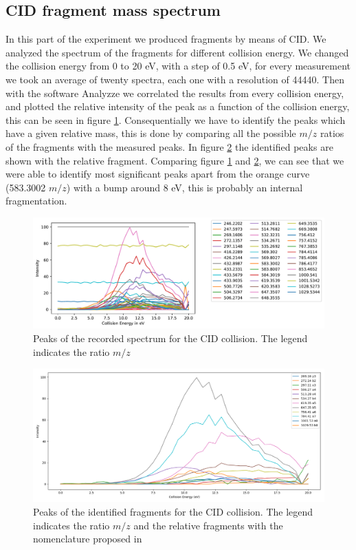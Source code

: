 \documentclass[a4paper,10pt]{article}
\begin{document}
\newpage

\subsection{CID fragment mass spectrum}
In this part of the experiment we produced fragments by means of CID. We analyzed the spectrum of the fragments for  different collision energy. %
We changed the collision energy from 0 to 20 eV, with a step of 0.5 eV, for every measurement we took an average of twenty spectra, each one with a resolution of 44440. Then with the software Analyzze we correlated the results from every collision energy, and plotted the relative intensity of the peak as a function of the collision energy, this can be seen in figure \ref{cidcollision}.
Consequentially we have to identify the peaks which have a given relative mass, this is done by comparing all the possible $m/z$ ratios of the fragments with the measured peaks. In figure \ref{cidcollisionidentified} the identified peaks are shown with the relative fragment. Comparing figure \ref{cidcollision} and \ref{cidcollisionidentified}, we can see that we were able to identify most significant peaks apart from the orange curve (583.3002 $m/z$) with a bump around 8 eV, this is probably an internal fragmentation.
\begin{figure}[H]
	\centering
	\includegraphics[width = \textwidth]{cid_collision}
	\caption{Peaks of the recorded spectrum for the CID collision. The legend indicates the ratio $m/z$}
	\label{cidcollision}
\end{figure}
\begin{figure}[H]
	\centering
	\includegraphics[width = \textwidth]{identifiedcid}
	\caption{Peaks of the identified fragments for the CID collision. The legend indicates the ratio $m/z$ and the relative fragments with the nomenclature proposed in \cite{fragmentsnomenclature}}
	\label{cidcollisionidentified}
\end{figure}
\end{document}

